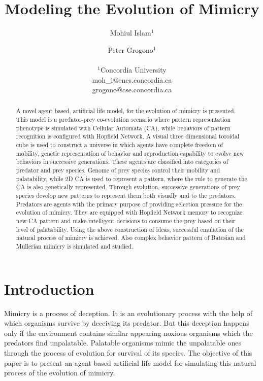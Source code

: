 \documentclass[letterpaper]{article}
\title{Modeling the Evolution of Mimicry}
\author{Mohiul Islam$^{1}$ \and Peter Grogono$^{1}$ \\
\mbox{}\\
$^1$Concordia University  \\
moh\_i@encs.concordia.ca \\
grogono@cse.concordia.ca}
\numberwithin{equation}{section}
\begin{document}
\maketitle

\begin{abstract}
A novel agent based, artificial life model, for the evolution of mimicry is presented. This model is a predator-prey co-evolution scenario where pattern representation phenotype is simulated with Cellular Automata (CA), while behaviors of pattern recognition is configured with Hopfield Network. A visual three dimensional toroidal cube is used to construct a universe in which agents have complete freedom of mobility, genetic representation of behavior and reproduction capability to evolve new behaviors in successive generations. These agents are classified into categories of predator and prey species. Genome of prey species control their mobility and palatability, while 2D CA is used to represent a pattern, where the rule to generate the CA is also genetically represented. Through evolution, successive generations of prey species develop new patterns to represent them both visually and to the predators. Predators are agents with the primary purpose of providing selection pressure for the evolution of mimicry. They are equipped with Hopfield Network memory to recognize new CA pattern and make intelligent decisions to consume the prey based on their level of palatability. Using the above construction of ideas, successful emulation of the natural process of mimicry is achieved. Also complex behavior pattern of Batesian and Mullerian mimicry is simulated and studied.
\end{abstract}

\section{Introduction}
\label{section:introduction}

Mimicry is a process of deception. It is an evolutionary process with the help of which organisms survive by deceiving its predator. But this deception happens only if the environment contains similar appearing noxious organisms which the predators find unpalatable. Palatable organisms mimic the unpalatable ones through the process of evolution for survival of its species. The objective of this paper is to present an agent based artificial life model for simulating this natural process of the evolution of mimicry.
\end{document}

